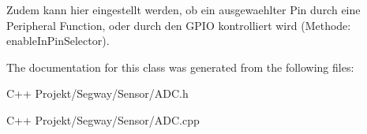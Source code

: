 Zudem kann hier eingestellt werden, ob ein ausgewaehlter Pin durch eine Peripheral Function, oder durch den G\+P\+I\+O kontrolliert wird (Methode\+: enable\+In\+Pin\+Selector). 

The documentation for this class was generated from the following files\+:\begin{DoxyCompactItemize}
\item 
C++ Projekt/\+Segway/\+Sensor/A\+D\+C.\+h\item 
C++ Projekt/\+Segway/\+Sensor/A\+D\+C.\+cpp\end{DoxyCompactItemize}
